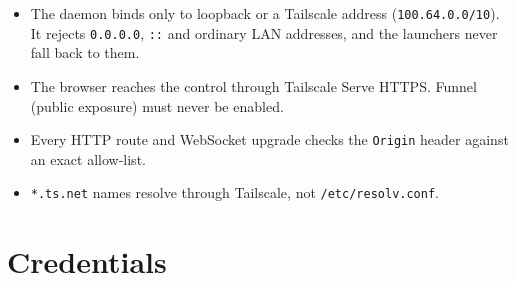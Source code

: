 \begin{itemize}
\item The daemon binds only to loopback or a Tailscale address (\texttt{100.\allowbreak{}64.\allowbreak{}0.\allowbreak{}0/\allowbreak{}10}). It rejects \texttt{0.\allowbreak{}0.\allowbreak{}0.\allowbreak{}0}, \texttt{:\allowbreak{}:\allowbreak{}} and ordinary LAN addresses, and the launchers never fall back to them.
\item The browser reaches the control through Tailscale Serve HTTPS. Funnel (public exposure) must never be enabled.
\item Every HTTP route and WebSocket upgrade checks the \texttt{Origin} header against an exact allow-list.
\item \texttt{*.\allowbreak{}ts.\allowbreak{}net} names resolve through Tailscale, not \texttt{/\allowbreak{}etc/\allowbreak{}resolv.\allowbreak{}conf}.
\end{itemize}

\section{\texorpdfstring{Credentials}{Credentials}}

